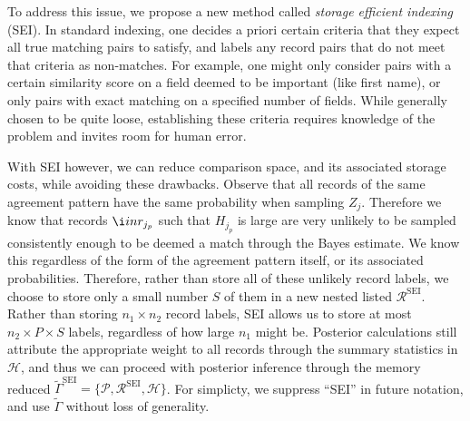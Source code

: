 \documentclass[12pt,letterpaper]{article}
\newcommand{\1}[1]{\mathbb{I}\!\left[#1\right]} %
\begin{document}

To address this issue, we propose a new method called \emph{storage	efficient indexing} (SEI). In standard indexing, one decides a priori certain criteria that they expect all true matching pairs to satisfy, 
and labels any record pairs that do not meet that criteria as
non-matches. For example, one might only consider pairs with a certain
similarity score on a field deemed to be important (like first name), or
only pairs with exact matching on a specified number of fields. While
generally chosen to be quite loose, establishing these criteria
requires knowledge of the problem and invites room for human error. 


With SEI however, we can reduce comparison space, and its associated storage costs, while avoiding these drawbacks. Observe that all records of the same agreement pattern have the same probability when sampling \(Z_j\). Therefore we know that records $\i in r_{j_p}$  such that
\(H_{j_p}\) is large are very unlikely to be sampled consistently enough
to be deemed a match through the Bayes estimate. We know this regardless of the form of the agreement pattern itself, or its associated probabilities. Therefore, rather than store all of these unlikely record labels, we choose to store only a small number \(S\) of them in a new nested listed $\mathcal{R}^{\text{SEI}}$. Rather than storing
\(n_1 \times n_2\) record labels, SEI allows us to store at most
\(n_2 \times P \times S\) labels, regardless of how large \(n_1\) might be. Posterior calculations still attribute the appropriate weight to all records through the summary statistics in $\mathcal{H}$, and thus we can proceed with posterior inference through the memory reduced $\tilde{\Gamma}^{\text{SEI}} = \{\mathcal{P}, \mathcal{R}^{\text{SEI}}, \mathcal{H}\}$. For simplicty, we suppress ``SEI'' in future notation, and use $\tilde{\Gamma}$ without loss of generality. 
\end{document}
